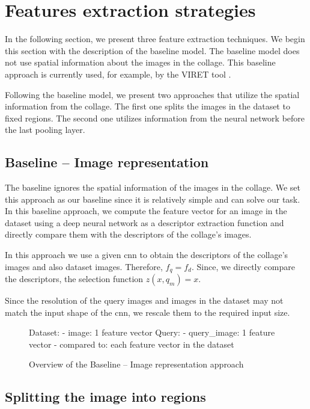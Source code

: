 \section{Features extraction strategies}

In the following section, we present three feature extraction techniques. We begin this section with the description of the baseline model. The baseline model does not use spatial information about the images in the collage. This baseline approach is currently used, for example, by the VIRET tool \citep{kovalvcik2020viret}. 

Following the baseline model, we present two approaches that utilize the spatial information from the collage. The first one splits the images in the dataset to fixed regions. The second one utilizes information from the neural network before the last pooling layer.

\subsection{Baseline -- Image representation}

The baseline ignores the spatial information of the images in the collage. We set this approach as our baseline since it is relatively simple and can solve our task. In this baseline approach, we compute the feature vector for an image in the dataset using a deep neural network as a descriptor extraction function and directly compare them with the descriptors of the collage's images.

In this approach we use a given \acrshort{cnn} to obtain the descriptors of the collage's images and also dataset images. Therefore, $f_q = f_d$. Since, we directly compare the descriptors, the selection function $z(x, q_m) = x$.

Since the resolution of the query images and images in the dataset may not match the input shape of the \acrshort{cnn}, we rescale them to the required input size.

\begin{figure}
\centering
\begin{boxedverbatim}
Dataset:
    - image: 1 feature vector
Query:
    - query_image: 1 feature vector
    - compared to: each feature vector in the dataset
\end{boxedverbatim}
\caption{Overview of the Baseline -- Image representation approach}
\end{figure}

\subsection{Splitting the image into regions}

